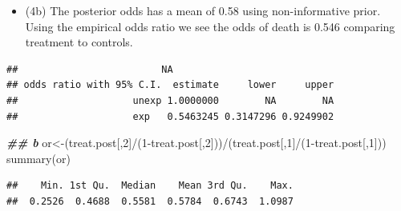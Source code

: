 \documentclass[
]{book}
\newenvironment{Shaded}{\begin{snugshade}}{\end{snugshade}}
\newcommand{\AttributeTok}[1]{\textcolor[rgb]{0.77,0.63,0.00}{#1}}
\newcommand{\DecValTok}[1]{\textcolor[rgb]{0.00,0.00,0.81}{#1}}
\newcommand{\DocumentationTok}[1]{\textcolor[rgb]{0.56,0.35,0.01}{\textbf{\textit{#1}}}}
\newcommand{\FunctionTok}[1]{\textcolor[rgb]{0.00,0.00,0.00}{#1}}
\newcommand{\NormalTok}[1]{#1}
\newcommand{\OtherTok}[1]{\textcolor[rgb]{0.56,0.35,0.01}{#1}}
\newcommand{\SpecialCharTok}[1]{\textcolor[rgb]{0.00,0.00,0.00}{#1}}
\newcommand{\StringTok}[1]{\textcolor[rgb]{0.31,0.60,0.02}{#1}}
\providecommand{\tightlist}{%
  \setlength{\itemsep}{0pt}\setlength{\parskip}{0pt}}
\theoremstyle{definition}
\theoremstyle{definition}
\theoremstyle{definition}
\theoremstyle{definition}
\theoremstyle{remark}
\begin{document}
\begin{itemize}
\tightlist
\item
  (4b) The posterior odds has a mean of 0.58 using non-informative prior. Using the empirical odds ratio we see the odds of death is 0.546 comparing treatment to controls.
\end{itemize}

\begin{Shaded}
\end{Shaded}

\begin{verbatim}
##                         NA
## odds ratio with 95% C.I.  estimate     lower     upper
##                    unexp 1.0000000        NA        NA
##                    exp   0.5463245 0.3147296 0.9249902
\end{verbatim}

\begin{Shaded}
\begin{Highlighting}[]
  \DocumentationTok{\#\# b}
\NormalTok{  or}\OtherTok{\textless{}{-}}\NormalTok{(treat.post[,}\DecValTok{2}\NormalTok{]}\SpecialCharTok{/}\NormalTok{(}\DecValTok{1}\SpecialCharTok{{-}}\NormalTok{treat.post[,}\DecValTok{2}\NormalTok{]))}\SpecialCharTok{/}\NormalTok{(treat.post[,}\DecValTok{1}\NormalTok{]}\SpecialCharTok{/}\NormalTok{(}\DecValTok{1}\SpecialCharTok{{-}}\NormalTok{treat.post[,}\DecValTok{1}\NormalTok{]))}
\FunctionTok{summary}\NormalTok{(or)}
\end{Highlighting}
\end{Shaded}

\begin{verbatim}
##    Min. 1st Qu.  Median    Mean 3rd Qu.    Max. 
##  0.2526  0.4688  0.5581  0.5784  0.6743  1.0987
\end{verbatim}
\end{document}
